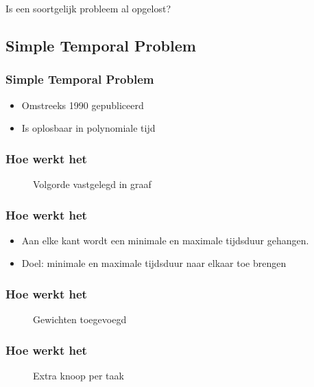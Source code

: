 \documentclass{beamer}
\theoremstyle{definition}
\newcommand{\inputtikz}[1]{}
\begin{document}
\begin{frame}
	\begin{center}
		Is een soortgelijk probleem al opgelost?
	\end{center}
\end{frame}

\subsection{Simple Temporal Problem}
\begin{frame}
    	\frametitle{Simple Temporal Problem}
	
	\begin{itemize}
		\item Omstreeks 1990 gepubliceerd
		\item Is oplosbaar in polynomiale tijd
	\end{itemize}
   	
\end{frame}

\begin{frame}
    	\frametitle{Hoe werkt het}
	
	\begin{figure}[ht]
		\inputtikz{stn_precedence}
		\vspace{-1em}
		\caption{Volgorde vastgelegd in graaf}
	\end{figure}
\end{frame}

\begin{frame}
    	\frametitle{Hoe werkt het}
	
	\begin{itemize}
		\item Aan elke kant wordt een minimale en maximale tijdsduur gehangen.
		\item Doel: minimale en maximale tijdsduur naar elkaar toe brengen
	\end{itemize}
	
\end{frame}

\begin{frame}
    	\frametitle{Hoe werkt het}
	
	\begin{figure}[ht]
		\inputtikz{stn_weighted}
		\vspace{-1em}
		\caption{Gewichten toegevoegd}
	\end{figure}
\end{frame}

\begin{frame}
    	\frametitle{Hoe werkt het}
	
	\begin{figure}[ht]
		\inputtikz{stn_expanded}
		\vspace{-1em}
		\caption{Extra knoop per taak}
	\end{figure}
\end{frame}
\end{document}
